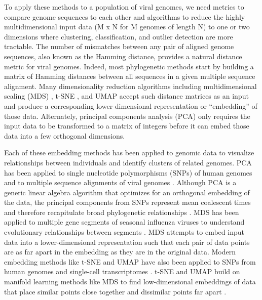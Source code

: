 \documentclass[9pt,lineno]{elife}
\begin{document}
To apply these methods to a population of viral genomes, we need metrics to compare genome sequences to each other and algorithms to reduce the highly multidimensional input data (M x N for M genomes of length N) to one or two dimensions where clustering, classification, and outlier detection are more tractable.
The number of mismatches between any pair of aligned genome sequences, also known as the Hamming distance, provides a natural distance metric for viral genomes.
Indeed, most phylogenetic methods start by building a matrix of Hamming distances between all sequences in a given multiple sequence alignment.
Many dimensionality reduction algorithms including multidimensional scaling (MDS) \citep{hout_papesh_goldinger_2012}, t-SNE \citep{maaten2008visualizing}, and UMAP \citep{lel2018umap} accept such distance matrices as an input and produce a corresponding lower-dimensional representation or “embedding” of those data.
Alternately, principal components analysis (PCA) only requires the input data to be transformed to a matrix of integers before it can embed those data into a few orthogonal dimensions.

Each of these embedding methods has been applied to genomic data to visualize relationships between individuals and identify clusters of related genomes.
PCA has been applied to single nucleotide polymorphisms (SNPs) of human genomes \citep{novembre_2008,alexander_2009,mcvean_2009,auton_2015} and to multiple sequence alignments of viral genomes \citep{metsky_2017}.
Although PCA is a generic linear algebra algorithm that optimizes for an orthogonal embedding of the data, the principal components from SNPs represent mean coalescent times and therefore recapitulate broad phylogenetic relationships \citep{mcvean_2009}.
MDS has been applied to multiple gene segments of seasonal influenza viruses to understand evolutionary relationships between segments \citep{rambaut_2008}.
MDS attempts to embed input data into a lower-dimensional representation such that each pair of data points are as far apart in the embedding as they are in the original data.
Modern embedding methods like t-SNE and UMAP have also been applied to SNPs from human genomes \citep{diaz-papkovich_2019} and single-cell transcriptomes \citep{becht_2018,kobak_2019}.
t-SNE and UMAP build on manifold learning methods like MDS to find low-dimensional embeddings of data that place similar points close together and dissimilar points far apart \citep{kobak_2021}.
\end{document}
